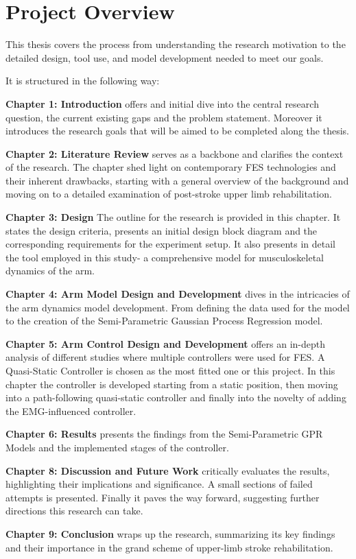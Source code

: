 \section{Project Overview}

This thesis covers the process from understanding the research motivation to the detailed design, tool use, and model development needed to meet our goals.

It is structured in the following way:

\textbf{Chapter 1: Introduction} offers and initial dive into the central research question, the current existing gaps and the problem statement. Moreover it introduces the research goals that will be aimed to be completed along the thesis.

\textbf{Chapter 2: Literature Review} serves as a backbone and clarifies the context of the research. The chapter shed light on contemporary FES technologies and their inherent drawbacks, starting with a general overview of the background and moving on to a detailed examination of post-stroke upper limb rehabilitation.

\textbf{Chapter 3: Design} The outline for the research is provided in this chapter. It states the design criteria, presents an initial design block diagram and the corresponding requirements for the experiment setup. It also presents in detail the tool employed in this study- a comprehensive model for musculoskeletal dynamics of the arm. 

\textbf{Chapter 4: Arm Model Design and Development} dives in the intricacies of the arm dynamics model development. From defining the data used for the model to the creation of the Semi-Parametric Gaussian Process Regression model.

\textbf{Chapter 5: Arm Control Design and Development} offers an in-depth analysis of different studies where multiple controllers were used for FES. A Quasi-Static Controller is chosen as the most fitted one or this project. In this chapter the controller is developed starting from a static position, then moving into a path-following quasi-static controller and finally into the novelty of adding the EMG-influenced controller.

\textbf{Chapter 6: Results} presents the findings from the Semi-Parametric GPR Models and the implemented stages of the controller.

\textbf{Chapter 8: Discussion and Future Work} critically evaluates the results, highlighting their implications and significance. A small sections of failed attempts is presented. Finally it paves the way forward, suggesting further directions this research can take.

\textbf{Chapter 9: Conclusion} wraps up the research, summarizing its key findings and their importance in the grand scheme of upper-limb stroke rehabilitation. 